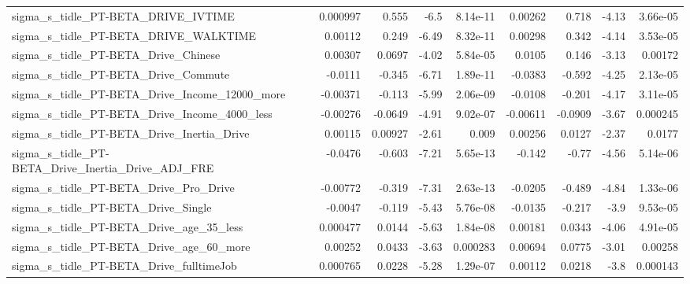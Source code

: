 \begin{tabular}{lrrrrrrrr}
sigma\_s\_tidle\_PT-BETA\_DRIVE\_IVTIME                 &    0.000997 &        0.555 &     -6.5 & 8.14e-11 &    0.00262 &       0.718 &        -4.13 &      3.66e-05 \\
sigma\_s\_tidle\_PT-BETA\_DRIVE\_WALKTIME               &     0.00112 &        0.249 &    -6.49 & 8.32e-11 &    0.00298 &       0.342 &        -4.14 &      3.53e-05 \\
sigma\_s\_tidle\_PT-BETA\_Drive\_Chinese                &     0.00307 &       0.0697 &    -4.02 & 5.84e-05 &     0.0105 &       0.146 &        -3.13 &       0.00172 \\
sigma\_s\_tidle\_PT-BETA\_Drive\_Commute                &     -0.0111 &       -0.345 &    -6.71 & 1.89e-11 &    -0.0383 &      -0.592 &        -4.25 &      2.13e-05 \\
sigma\_s\_tidle\_PT-BETA\_Drive\_Income\_12000\_more      &    -0.00371 &       -0.113 &    -5.99 & 2.06e-09 &    -0.0108 &      -0.201 &        -4.17 &      3.11e-05 \\
sigma\_s\_tidle\_PT-BETA\_Drive\_Income\_4000\_less       &    -0.00276 &      -0.0649 &    -4.91 & 9.02e-07 &   -0.00611 &     -0.0909 &        -3.67 &      0.000245 \\
sigma\_s\_tidle\_PT-BETA\_Drive\_Inertia\_Drive          &     0.00115 &      0.00927 &    -2.61 &    0.009 &    0.00256 &      0.0127 &        -2.37 &        0.0177 \\
sigma\_s\_tidle\_PT-BETA\_Drive\_Inertia\_Drive\_ADJ\_FRE  &     -0.0476 &       -0.603 &    -7.21 & 5.65e-13 &     -0.142 &       -0.77 &        -4.56 &      5.14e-06 \\
sigma\_s\_tidle\_PT-BETA\_Drive\_Pro\_Drive              &    -0.00772 &       -0.319 &    -7.31 & 2.63e-13 &    -0.0205 &      -0.489 &        -4.84 &      1.33e-06 \\
sigma\_s\_tidle\_PT-BETA\_Drive\_Single                 &     -0.0047 &       -0.119 &    -5.43 & 5.76e-08 &    -0.0135 &      -0.217 &         -3.9 &      9.53e-05 \\
sigma\_s\_tidle\_PT-BETA\_Drive\_age\_35\_less            &    0.000477 &       0.0144 &    -5.63 & 1.84e-08 &    0.00181 &      0.0343 &        -4.06 &      4.91e-05 \\
sigma\_s\_tidle\_PT-BETA\_Drive\_age\_60\_more            &     0.00252 &       0.0433 &    -3.63 & 0.000283 &    0.00694 &      0.0775 &        -3.01 &       0.00258 \\
sigma\_s\_tidle\_PT-BETA\_Drive\_fulltimeJob            &    0.000765 &       0.0228 &    -5.28 & 1.29e-07 &    0.00112 &      0.0218 &         -3.8 &      0.000143 \\

\end{tabular}
